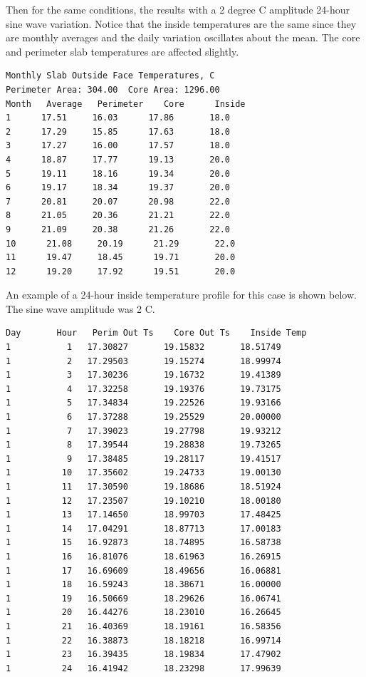Then for the same conditions, the results with a 2 degree C amplitude 24-hour sine wave variation. Notice that the inside temperatures are the same since they are monthly averages and the daily variation oscillates about the mean. The core and perimeter slab temperatures are affected slightly.

\begin{lstlisting}
Monthly Slab Outside Face Temperatures, C
Perimeter Area: 304.00  Core Area: 1296.00
Month   Average   Perimeter    Core      Inside
1      17.51     16.03      17.86       18.0
2      17.29     15.85      17.63       18.0
3      17.27     16.00      17.57       18.0
4      18.87     17.77      19.13       20.0
5      19.11     18.16      19.34       20.0
6      19.17     18.34      19.37       20.0
7      20.81     20.07      20.98       22.0
8      21.05     20.36      21.21       22.0
9      21.09     20.38      21.26       22.0
10      21.08     20.19      21.29       22.0
11      19.47     18.45      19.71       20.0
12      19.20     17.92      19.51       20.0
\end{lstlisting}

An example of a 24-hour inside temperature profile for this case is shown below. The sine wave amplitude was 2 C.

\begin{lstlisting}
Day       Hour   Perim Out Ts    Core Out Ts    Inside Temp
1           1   17.30827       19.15832       18.51749
1           2   17.29503       19.15274       18.99974
1           3   17.30236       19.16732       19.41389
1           4   17.32258       19.19376       19.73175
1           5   17.34834       19.22526       19.93166
1           6   17.37288       19.25529       20.00000
1           7   17.39023       19.27798       19.93212
1           8   17.39544       19.28838       19.73265
1           9   17.38485       19.28117       19.41517
1          10   17.35602       19.24733       19.00130
1          11   17.30590       19.18686       18.51924
1          12   17.23507       19.10210       18.00180
1          13   17.14650       18.99703       17.48425
1          14   17.04291       18.87713       17.00183
1          15   16.92873       18.74895       16.58738
1          16   16.81076       18.61963       16.26915
1          17   16.69609       18.49656       16.06881
1          18   16.59243       18.38671       16.00000
1          19   16.50669       18.29626       16.06741
1          20   16.44276       18.23010       16.26645
1          21   16.40369       18.19161       16.58356
1          22   16.38873       18.18218       16.99714
1          23   16.39435       18.19834       17.47902
1          24   16.41942       18.23298       17.99639
\end{lstlisting}

